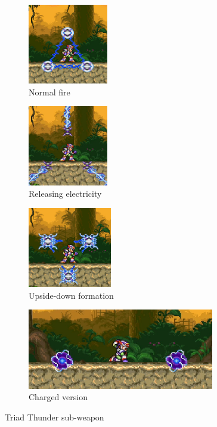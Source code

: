 \begin{figure}[htp]
	\centering
	\begin{subfigure}{3.9cm}
		\centering
		\includegraphics[height=3.5cm]{figures/X3/weapons/T_thunder.png}
		\caption{Normal fire}	
	\end{subfigure}
	\begin{subfigure}{3.9cm}
		\centering
		\includegraphics[height=3.5cm]{figures/X3/weapons/T_thunder_3.png}
		\caption{Releasing electricity}	
	\end{subfigure}
	\begin{subfigure}{3.9cm}
		\centering
		\includegraphics[height=3.5cm]{figures/X3/weapons/T_thunder_2.png}
		\caption{Upside-down formation}	
	\end{subfigure}
	\begin{subfigure}{\linewidth}
		\centering
		\includegraphics[height=3.5cm]{figures/X3/weapons/T_thunder_C.png}
		\caption{Charged version}	
	\end{subfigure}
	\caption{Triad Thunder sub-weapon}
\end{figure}

